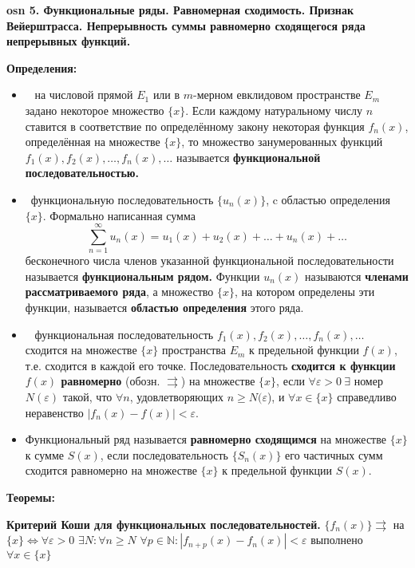 \textbf{\LARGE osn 5. Функциональные ряды. Равномерная сходимость. Признак Вейерштрасса. Непрерывность суммы  равномерно сходящегося ряда непрерывных функций.}

\textbf{Определения:}
\begin{itemize}
    \item \mathLet ~ на числовой прямой $E_1$ или в $m$-мерном евклидовом пространстве $E_m$ задано некоторое множество $\{x\}$.
    Если каждому натуральному числу $n$ ставится в соответствие по определённому закону некоторая функция $f_n(x)$, определённая на множестве $\{x\}$, то множество занумерованных функций $f_1(x),f_2(x),\dots,f_n(x),\dots$ называется \textbf{функциональной последовательностью.}
    
    \item \faEye \ функциональную последовательность $\{u_n(x)\}$, c областью определения $\{x\}$.
    Формально написанная сумма
    $$\displaystyle \sum_{n=1}^{\infty} u_n(x) = u_1(x) + u_2(x) + \dots + u_n(x) + \dots$$
    бесконечного числа членов указанной функциональной последовательности называется \textbf{функциональным рядом.}
    Функции $u_n(x)$ называются \textbf{членами рассматриваемого ряда}, а множество $\{x\}$, на котором определены эти функции, называется \textbf{областью определения} этого ряда.
    
    \item  \mathLet ~ функциональная последовательность
    $f_1(x), f_2(x), \dots, f_n(x), \dots$ сходится на множестве $\{x\}$ пространства $E_m$ к предельной функции $f(x)$, т.е. сходится в каждой его точке.
    Последовательность \textbf{сходится к функции $f(x)$ равномерно} (обозн. $\rightrightarrows$) на множестве $\{x\}$, если $\forall \varepsilon > 0 ~ \exists$ номер $N(\varepsilon)$ такой, что $\forall n$, удовлетворяющих $n \geqslant N(\varepsilon$), и $\forall x \in \{x\}$ справедливо неравенство $|f_n(x) - f(x)| < \varepsilon$.
    
    \item Функциональный ряд называется \textbf{равномерно сходящимся} на множестве $\{x\}$ к сумме $S(x)$, если последовательность $\{S_n(x)\}$ его частичных сумм сходится равномерно на множестве $\{x\}$ к предельной функции $S(x)$.

\end{itemize}


\textbf{Теоремы:}

\bigbreak 
\textbf{Критерий Коши для функциональных последовательностей.} 
$\{f_n(x)\} \rightrightarrows$ на $\{x\} \iff \forall \varepsilon > 0$ $\exists N: \forall n \geq N$ $\forall p \in \mathbb{N}: |f_{n+p}(x) - f_n(x)| < \varepsilon$ выполнено $\forall x \in \{x\}$

